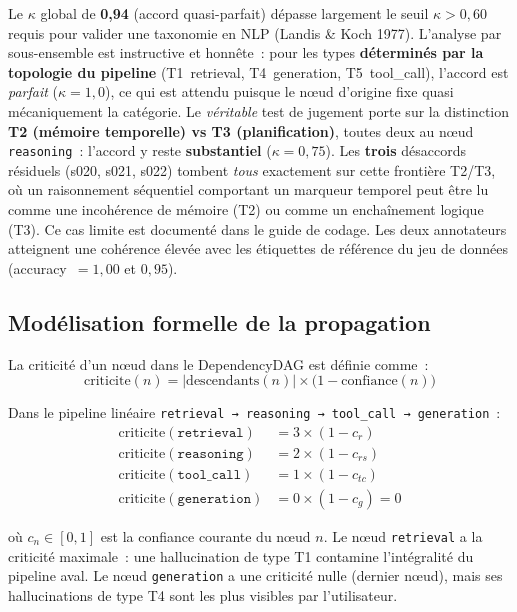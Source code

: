 \documentclass[12pt,a4paper]{article}
\begin{document}
Le $\kappa$ global de \textbf{0,94} (accord quasi-parfait) dépasse largement le seuil $\kappa > 0{,}60$ requis pour valider une taxonomie en NLP (Landis \& Koch 1977). L'analyse par sous-ensemble est instructive et honnête~: pour les types \textbf{déterminés par la topologie du pipeline} (T1~retrieval, T4~generation, T5~tool\_call), l'accord est \emph{parfait} ($\kappa=1{,}0$), ce qui est attendu puisque le nœud d'origine fixe quasi mécaniquement la catégorie. Le \emph{véritable} test de jugement porte sur la distinction \textbf{T2 (mémoire temporelle) vs T3 (planification)}, toutes deux au nœud \texttt{reasoning}~: l'accord y reste \textbf{substantiel} ($\kappa=0{,}75$). Les \textbf{trois} désaccords résiduels (s020, s021, s022) tombent \emph{tous} exactement sur cette frontière T2/T3, où un raisonnement séquentiel comportant un marqueur temporel peut être lu comme une incohérence de mémoire (T2) ou comme un enchaînement logique (T3). Ce cas limite est documenté dans le guide de codage. Les deux annotateurs atteignent une cohérence élevée avec les étiquettes de référence du jeu de données (accuracy~$=1{,}00$ et $0{,}95$).

\subsection{Modélisation formelle de la propagation}

La criticité d'un nœud dans le DependencyDAG est définie comme~:
\begin{equation}
\text{criticite}(n) = |\text{descendants}(n)| \times \bigl(1 - \text{confiance}(n)\bigr)
\label{eq:criticite}
\end{equation}

Dans le pipeline linéaire \texttt{retrieval~→~reasoning~→~tool\_call~→~generation}~:
\begin{align}
\text{criticite}(\texttt{retrieval}) &= 3 \times (1 - c_r) \label{eq:crit_retrieval}\\
\text{criticite}(\texttt{reasoning}) &= 2 \times (1 - c_{rs}) \label{eq:crit_reasoning}\\
\text{criticite}(\texttt{tool\_call}) &= 1 \times (1 - c_{tc}) \label{eq:crit_toolcall}\\
\text{criticite}(\texttt{generation}) &= 0 \times (1 - c_g) = 0 \label{eq:crit_generation}
\end{align}

où $c_n \in [0,1]$ est la confiance courante du nœud $n$. Le nœud \texttt{retrieval} a la criticité maximale~: une hallucination de type T1 contamine l'intégralité du pipeline aval. Le nœud \texttt{generation} a une criticité nulle (dernier nœud), mais ses hallucinations de type T4 sont les plus visibles par l'utilisateur.
\end{document}
